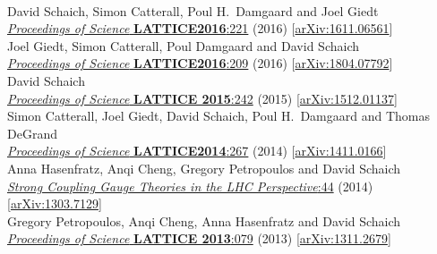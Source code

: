 \begin{spacelist}
\begin{revnumerate}
    \pagebreakitem
       \\
      David Schaich, Simon Catterall, Poul H.~Damgaard and Joel Giedt \\
      \href{https://doi.org/10.22323/1.256.0221}{\textit{Proceedings of Science} \textbf{LATTICE2016}:221} (2016) [\href{http://arxiv.org/abs/1611.06561}{arXiv:1611.06561}]
    \pagebreakitem
       \\
      Joel Giedt, Simon Catterall, Poul Damgaard and David Schaich \\
      \href{https://doi.org/10.22323/1.256.0209}{\textit{Proceedings of Science} \textbf{LATTICE2016}:209} (2016) [\href{http://arxiv.org/abs/1804.07792}{arXiv:1804.07792}]
    \pagebreakitem
       \\
      David Schaich \\
      \href{https://doi.org/10.22323/1.251.0242}{\textit{Proceedings of Science} \textbf{LATTICE 2015}:242} (2015) [\href{http://arxiv.org/abs/1512.01137}{arXiv:1512.01137}]
    \pagebreakitem
       \\
      Simon Catterall, Joel Giedt, David Schaich, Poul H.~Damgaard and Thomas DeGrand \\
      \href{https://doi.org/10.22323/1.214.0267}{\textit{Proceedings of Science} \textbf{LATTICE2014}:267} (2014) [\href{http://arxiv.org/abs/1411.0166}{arXiv:1411.0166}]
    \pagebreakitem
       \\
      Anna Hasenfratz, Anqi Cheng, Gregory Petropoulos and David Schaich \\
      \href{http://dx.doi.org/10.1142/9789814566254_0004}{\textit{Strong Coupling Gauge Theories in the LHC Perspective}:44} (2014) [\href{http://arxiv.org/abs/1303.7129}{arXiv:1303.7129}]
    \pagebreakitem
       \\
      Gregory Petropoulos, Anqi Cheng, Anna Hasenfratz and David Schaich \\
      \href{https://doi.org/10.22323/1.187.0079}{\textit{Proceedings of Science} \textbf{LATTICE 2013}:079} (2013) [\href{http://arxiv.org/abs/1311.2679}{arXiv:1311.2679}]
    \pagebreakitem
       \\

\end{revnumerate}
\end{spacelist}
